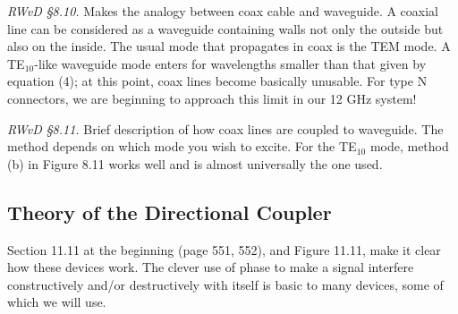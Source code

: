 \documentclass[preprint]{aastex}
\begin{document}
          {\it RWvD \S 8.10.} Makes the analogy between coax cable and
waveguide.  A coaxial line can be considered as a waveguide containing
walls not only the outside but also on the inside.  The usual mode that
propagates in coax is the TEM mode.  A TE$_{10}$-like waveguide mode
enters for wavelengths smaller than that given by equation (4); at this
point, coax lines become basically unusable.  For type N connectors, we
are beginning to approach this limit in our 12 GHz system!

{\it RWvD \S 8.11.} Brief description of how coax lines are coupled to
waveguide. The method depends on which mode you wish to excite. For the
TE$_{10}$ mode, method (b) in Figure 8.11 works well and is almost
universally the one used.

\subsection {Theory of the Directional Coupler}

          Section 11.11 at the beginning (page 551, 552), and Figure
11.11, make it clear how these devices work. The clever use of phase to
make a signal interfere constructively and/or destructively with itself
is basic to many devices, some of which we will use.
\end{document}
